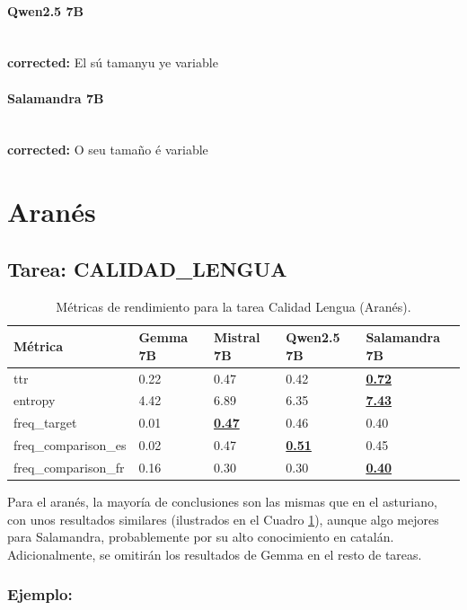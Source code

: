 \paragraph{Qwen2.5 7B}~\\
\textbf{corrected:} El sú tamanyu ye variable

\paragraph{Salamandra 7B}~\\
\textbf{corrected:} O seu tamaño é variable

\vspace{1em}

\section{Aranés}

\subsection{Tarea: CALIDAD\_LENGUA}\label{tarea-calidad_lengua}
\begin{longtable}[]{@{}lllll@{}}
\toprule\noalign{}
Métrica & Gemma 7B & Mistral 7B & Qwen2.5 7B & Salamandra 7B \\
\midrule\noalign{}
\endhead
\bottomrule\noalign{}
\caption{Métricas de rendimiento para la tarea Calidad Lengua (Aranés).}
\label{tab:metricas_calidad_lengua_Aranés}
\endlastfoot
ttr & 0.22 & 0.47 & 0.42 & \textbf{\underline{0.72}} \\
entropy & 4.42 & 6.89 & 6.35 & \textbf{\underline{7.43}} \\
freq\_target & 0.01 & \textbf{\underline{0.47}} & 0.46 & 0.40 \\
freq\_comparison\_es & 0.02 & 0.47 & \textbf{\underline{0.51}} & 0.45 \\
freq\_comparison\_fr & 0.16 & 0.30 & 0.30 & \textbf{\underline{0.40}} \\
\end{longtable}
Para el aranés, la mayoría de conclusiones son las mismas que en el asturiano, con unos resultados similares (ilustrados en el Cuadro \ref{tab:metricas_calidad_lengua_Aranés}), aunque algo mejores para Salamandra, probablemente por su alto conocimiento en catalán. Adicionalmente, se omitirán los resultados de Gemma en el resto de tareas.

\subsubsection{Ejemplo:}

